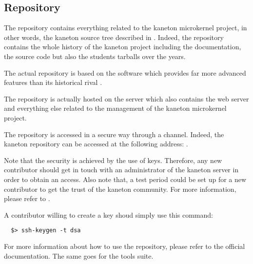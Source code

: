 %
%
%
%
%
%

%
%

\subsection{Repository}
\label{section:repository}

The repository contains everything related to the kaneton microkernel
project, in other words, the kaneton source tree described in
. Indeed, the repository contains
the whole history of the kaneton project including the documentation, the
source code but also the students tarballs over the years.

The actual repository is based on the  software which
provides far more advanced features than its historical rival .

The repository is actually hosted on the  server
which also contains the web server and everything else related to the
management of the kaneton microkernel project.

The repository is accessed in a secure way through a  channel.
Indeed, the kaneton  repository can be accessed at the
following address:
.

Note that the security is achieved by the use of  keys. Therefore,
any new contributor should get in touch with an administrator of the
kaneton server in order to obtain an access. Also note that, a test period
could be set up for a new contributor to get the trust of the kaneton
community. For more information, please refer to .

A contributor willing to create a  key shoud simply use this
 command:

\begin{verbatim}
  $> ssh-keygen -t dsa
\end{verbatim}

For more information about how to use the repository, please refer to the
official  documentation. The same goes for the
 tools suite.

